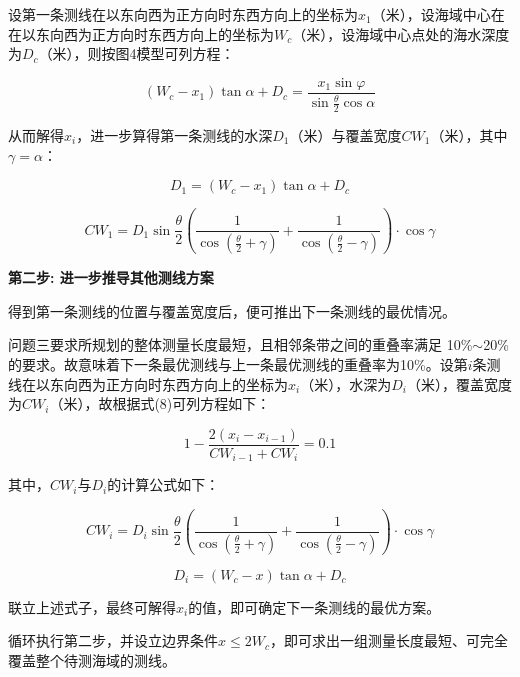 设第一条测线在以东向西为正方向时东西方向上的坐标为$x_1$（米），设海域中心在在以东向西为正方向时东西方向上的坐标为$W_c$（米），设海域中心点处的海水深度为$D_c$（米），则按图4模型可列方程：

\begin{equation}
    (W_c - x_1) \tan\alpha+D_c = \frac{x_1\sin \varphi}{\sin \frac{\theta}{2} \cos \alpha}
\end{equation}

从而解得$x_i$，进一步算得第一条测线的水深$D_1$（米）与覆盖宽度$CW_1$（米），其中$\gamma = \alpha$：

\begin{equation}
    D_1 =  (W_c - x_1) \tan{\alpha} + D_c
\end{equation}

\begin{equation}
    CW_1 = D_1\sin\frac{\theta}{2}\left(\frac{1}{\cos(\frac{\theta}{2}+\gamma)} + \frac{1}{\cos(\frac{\theta}{2}-\gamma)}\right) \cdot \cos \gamma
\end{equation}

\textbf{第二步: 进一步推导其他测线方案}

得到第一条测线的位置与覆盖宽度后，便可推出下一条测线的最优情况。

问题三要求所规划的整体测量长度最短，且相邻条带之间的重叠率满足 10\%$\sim$20\% 的要求。故意味着下一条最优测线与上一条最优测线的重叠率为10\%。设第$i$条测线在以东向西为正方向时东西方向上的坐标为$x_i$（米），水深为$D_i$（米），覆盖宽度为$CW_i$（米），故根据式(8)可列方程如下：

\begin{equation}
    1-\frac{2(x_i-x_{i-1})}{CW_{i-1}+CW_i} = 0.1
\end{equation}

其中，$CW_i$与$D_i$的计算公式如下：

\begin{equation}
    CW_i = D_i\sin\frac{\theta}{2}\left(\frac{1}{\cos(\frac{\theta}{2}+\gamma)} + \frac{1}{\cos(\frac{\theta}{2}-\gamma)}\right) \cdot \cos \gamma
\end{equation}

\begin{equation}
    D_i =  (W_c - x) \tan{\alpha} + D_c
\end{equation}

联立上述式子，最终可解得$x_i$的值，即可确定下一条测线的最优方案。

循环执行第二步，并设立边界条件$ x \leq 2W_c $，即可求出一组测量长度最短、可完全覆盖整个待测海域的测线。

